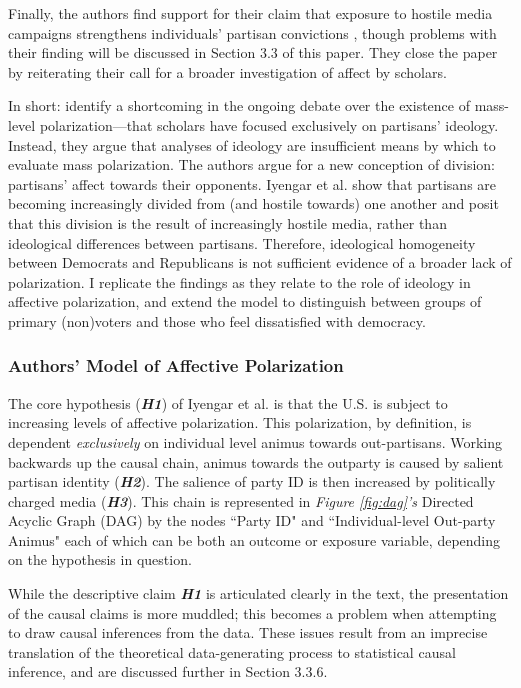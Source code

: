 \documentclass[12pt]{article}
\begin{document}
Finally, the authors find support for their claim that exposure to hostile media campaigns strengthens individuals' partisan convictions \citep[p. 407]{iyengar2012affect}, though problems with their finding will be discussed in Section 3.3 of this paper. They close the paper by reiterating their call for a broader investigation of affect by scholars.

In short: \citeauthor{iyengar2012affect} identify a shortcoming in the ongoing debate over the existence of mass-level polarization---that scholars have focused exclusively on partisans' ideology. Instead, they argue that analyses of ideology are insufficient means by which to evaluate mass polarization. The authors argue for a new conception of division: partisans' affect towards their opponents. Iyengar et al. show that partisans are becoming increasingly divided from (and hostile towards) one another and posit that this division is the result of increasingly hostile media, rather than ideological differences between partisans. Therefore, ideological homogeneity between Democrats and Republicans is not sufficient evidence of a broader lack of polarization. I replicate the findings as they relate to the role of ideology in affective polarization, and extend the model to distinguish between groups of primary (non)voters and those who feel dissatisfied with democracy.

\subsubsection{Authors' Model of Affective Polarization}
The core hypothesis (\textit{\textbf{H1}}) of Iyengar et al. is that the U.S. is subject to increasing levels of affective polarization. This polarization, by definition, is dependent \textit{exclusively} on individual level animus towards out-partisans. Working backwards up the causal chain, animus towards the outparty is caused by salient partisan identity (\textit{\textbf{H2}}). The salience of party ID is then increased by politically charged media (\textit{\textbf{H3}}). This chain is represented in \textit{Figure \ref{fig:dag}'s} Directed Acyclic Graph (DAG) by the nodes ``Party ID" and ``Individual-level Out-party Animus" each of which can be both an outcome or exposure variable, depending on the hypothesis in question.

While the descriptive claim \textbf{\textit{H1}} is articulated clearly in the text, the presentation of the causal claims is more muddled; this becomes a problem when attempting to draw causal inferences from the data. These issues result from an imprecise translation of the theoretical data-generating process to statistical causal inference, and are discussed further in Section 3.3.6.
\end{document}
